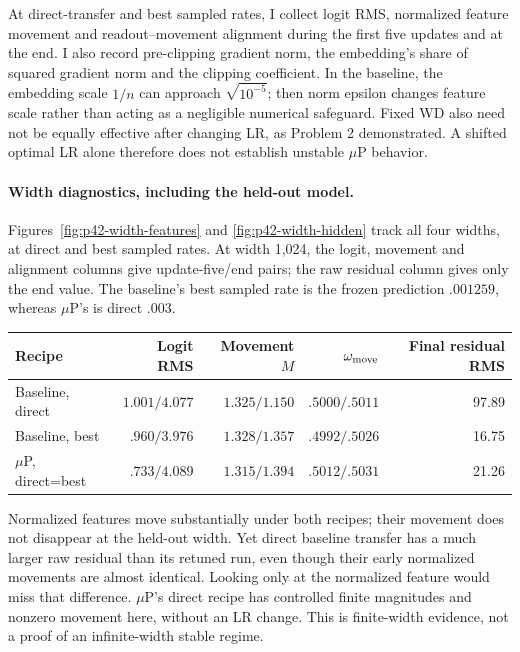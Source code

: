 \documentclass{article}
\begin{document}
At direct-transfer and best sampled rates, I collect logit RMS, normalized
feature movement and readout--movement alignment during the first five
updates and at the end. I also record pre-clipping gradient norm,
the embedding's share of squared gradient norm and the clipping
coefficient. In the baseline, the embedding scale $1/n$ can approach
$\sqrt{10^{-5}}$; then norm epsilon changes feature scale rather than
acting as a negligible numerical safeguard. Fixed WD also need not be
equally effective after changing LR, as Problem 2 demonstrated. A shifted
optimal LR alone therefore does not establish unstable $\mu$P behavior.

\paragraph{Width diagnostics, including the held-out model.}
Figures~\ref{fig:p42-width-features} and \ref{fig:p42-width-hidden}
track all four widths, at direct and best sampled rates. At width 1,024,
the logit, movement and alignment columns give update-five/end pairs; the raw residual
column gives only the end value. The baseline's best sampled rate is the
frozen prediction $.001259$, whereas $\mu$P's is direct $.003$.
\begin{center}
\small
\setlength{\tabcolsep}{4pt}
\begin{tabular}{lrrrr}
\toprule
Recipe & Logit RMS & Movement $M$ & $\omega_{\rm move}$ & Final residual RMS \\
\midrule
Baseline, direct & $1.001/4.077$ & $1.325/1.150$ & $.5000/.5011$ & 97.89 \\
Baseline, best & $.960/3.976$ & $1.328/1.357$ & $.4992/.5026$ & 16.75 \\
$\mu$P, direct=best & $.733/4.089$ & $1.315/1.394$ & $.5012/.5031$ & 21.26 \\
\bottomrule
\end{tabular}
\end{center}

Normalized features move substantially under both recipes; their movement
does not disappear at the held-out width. Yet direct baseline transfer
has a much larger raw residual than its retuned run, even though their
early normalized movements are almost identical. Looking only at the
normalized feature would miss that difference. $\mu$P's direct recipe
has controlled finite magnitudes and nonzero movement here, without an
LR change. This is finite-width evidence, not a proof of an infinite-width
stable regime.
\end{document}
